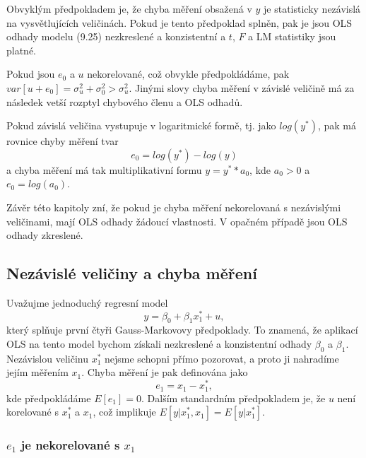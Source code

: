 Obvyklým předpokladem je, že chyba měření obsažená v $y$ je statisticky nezávislá na vysvětlujících veličinách. Pokud je tento předpoklad splněn, pak je jsou OLS odhady modelu (9.25) nezkreslené a konzistentní a $t$, $F$ a LM statistiky jsou platné.

Pokud jsou $e_0$ a $u$ nekorelované, což obvykle předpokládáme, pak $var[u + e_0] = \sigma_u^2 + \sigma_0^2 > \sigma_u^2$. Jinými slovy chyba měření v závislé veličině má za následek vetší rozptyl chybového členu a OLS odhadů.

Pokud závislá veličina vystupuje v logaritmické formě, tj. jako $log(y^*)$, pak má rovnice chyby měření tvar
\begin{equation}
e_0 = log(y^*) - log(y)
\end{equation}
a chyba měření má tak multiplikativní formu $y = y^* * a_0$, kde $a_0 > 0$ a $e_0 = log(a_0)$.

Závěr této kapitoly zní, že pokud je chyba měření nekorelovaná s nezávislými veličinami, mají OLS odhady žádoucí vlastnosti. V opačném případě jsou OLS odhady zkreslené.

\subsection{Nezávislé veličiny a chyba měření}

Uvažujme jednoduchý regresní model
\begin{equation}
y = \beta_0 + \beta_1 x_1^* + u,
\end{equation}
který splňuje první čtyři Gauss-Markovovy předpoklady. To znamená, že aplikací OLS na tento model bychom získali nezkreslené a konzistentní odhady $\beta_0$ a $\beta_1$. Nezávislou veličinu $x_1^*$ nejsme schopni přímo pozorovat, a proto ji nahradíme jejím měřením $x_1$. Chyba měření je pak definována jako
\begin{equation}
e_1 = x_1 - x_1^*,
\end{equation}
kde předpokládáme $E[e_1] = 0$. Dalším standardním předpokladem je, že $u$ není korelované s $x_1^*$ a $x_1$, což implikuje $E[y|x_1^*, x_1] = E[y|x_1^*]$.

\subsubsection{$e_1$ je nekorelované s $x_1$}


